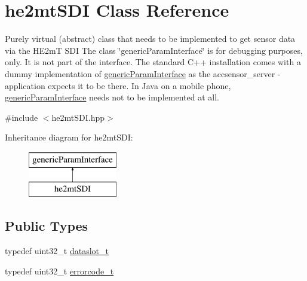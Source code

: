 \hypertarget{classhe2mt_s_d_i}{\section{he2mt\-S\-D\-I Class Reference}
\label{classhe2mt_s_d_i}
}


Purely virtual (abstract) class that needs to be implemented to get sensor data via the H\-E2m\-T S\-D\-I The class \char`\"{}generic\-Param\-Interface\char`\"{} is for debugging purposes, only. It is not part of the interface. The standard C++ installation comes with a dummy implementation of \hyperlink{classgeneric_param_interface}{generic\-Param\-Interface} as the accsensor\-\_\-server -\/ application expects it to be there. In Java on a mobile phone, \hyperlink{classgeneric_param_interface}{generic\-Param\-Interface} needs not to be implemented at all.  




{\ttfamily \#include $<$he2mt\-S\-D\-I.\-hpp$>$}

Inheritance diagram for he2mt\-S\-D\-I\-:\begin{figure}[H]
\begin{center}
\leavevmode
\includegraphics[height=2.000000cm]{classhe2mt_s_d_i}
\end{center}
\end{figure}
\subsection*{Public Types}
\begin{DoxyCompactItemize}
\item 
typedef uint32\-\_\-t \hyperlink{classhe2mt_s_d_i_ad0bd9136f18c52d27b93cfca85bf05dd}{dataslot\-\_\-t}
\item 
typedef uint32\-\_\-t \hyperlink{classhe2mt_s_d_i_aa527ccf96fd5eacc154c1c23e56fc9fd}{errorcode\-\_\-t}
\end{DoxyCompactItemize}
